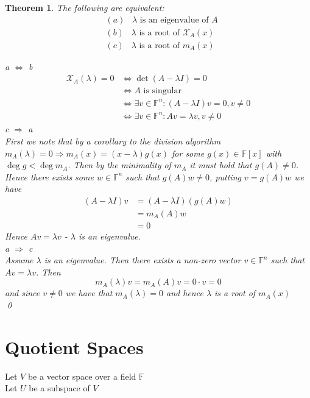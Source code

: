 \documentclass[11pt, a4paper]{report}
\makeatletter
\numberwithin{equation}{section}
\renewcommand{\chi}{\mathcal{X}}
\newcommand{\F}{\mathbb{F}}
\numberwithin{equation}{subsection}
\theoremstyle{plain}
\newtheorem{thm}{Theorem}[chapter] %
\theoremstyle{definition}
\theoremstyle{remark}
\newtheorem*{prf}{Proof}
\renewenvironment{prf}[1][\proofname]{\par
  \vspace{-\topsep}%
  \normalfont
  \topsep0pt \partopsep0pt %
  \trivlist
  \item[\hskip\labelsep
        \itshape
    #1\@addpunct{.}]\ignorespaces
}{%
  \popQED\endtrivlist\@endpefalse
  \addvspace{6pt plus 6pt} %
}
\newcommand{\pr}[1]{\begin{adjustwidth}{1cm}{} \begin{prf} #1 \end{prf} \end{adjustwidth}}
\makeatother
\begin{document}
\begin{thm} The following are equivalent: 
\begin{align*}
&(a) \;\;\; \lambda \text{ is an eigenvalue of } A \\
&(b) \;\;\; \lambda \text{ is a root of } \chi_A(x) \\
&(c) \;\;\; \lambda \text{ is a root of } m_A(x)
\end{align*}
\pr{ a $\iff$ b
\begin{align*}
\chi_A(\lambda) = 0 	&\iff \det(A - \lambda I) = 0\\
						&\iff \text{$A$ is singular}\\
						&\iff \exists v \in \F^n : (A - \lambda I)v = 0, v \neq 0\\
						&\iff \exists v \in \F^n : Av = \lambda v, v \neq 0
\end{align*}
c $\Rightarrow$ a\\
First we note that by a corollary to the division algorithm $m_A(\lambda) = 0 \Rightarrow m_A(x) = (x - \lambda) g(x)$ for some $g(x) \in \F[x]$ with $\deg g < \deg m_A$. Then by the minimality of $m_A$ it must hold that $g(A) \neq 0$. Hence there exists some $w \in \F^n$ such that $g(A) w \neq 0$, putting $v = g(A)w$ we have
\begin{align*}
(A - \lambda I)v 	&= (A - \lambda I)(g(A) w)\\
					&= m_A(A) w\\
					&= 0
\end{align*}
Hence $Av = \lambda v$ - $\lambda$ is an eigenvalue.\\
a $\Rightarrow$ c\\
Assume $\lambda$ is an eigenvalue. Then there exists a non-zero vector $v \in \F^n$ such that $Av = \lambda v$. Then
$$m_A(\lambda)v = m_A(A) v = 0 \cdot v = 0$$ and since $v \neq 0$ we have that $m_A(\lambda) = 0$ and hence $\lambda$ is a root of $m_A(x)$\\ \qed
}
\end{thm}

\chapter{Quotient Spaces}
Let $V$ be a vector space over a field $\F$\\
Let $U$ be a subspace of $V$
\end{document}
